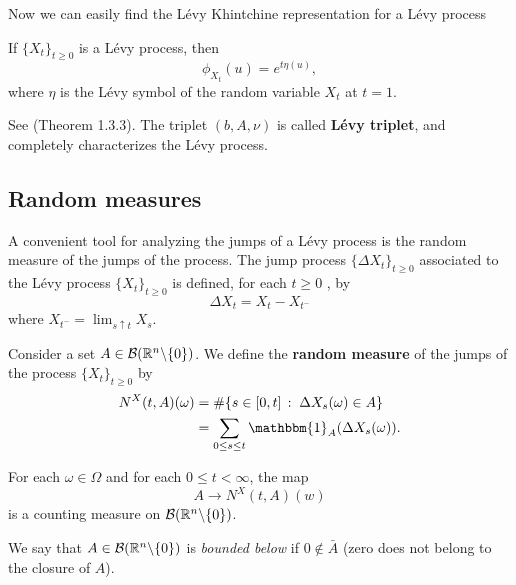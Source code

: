 Now we can easily find the Lévy Khintchine representation for a Lévy process
\begin{Theorem}
 If $\{X_t\}_{t \ge 0}$ is a Lévy process, then
 \begin{equation}\label{Levy_Kint}
  \phi_{X_t}(u) = e^{t \eta(u)},
 \end{equation}
where $\eta$ is the Lévy symbol of the random variable $X_t$ at $t=1$.
\end{Theorem}
See \cite{Applebaum} (Theorem 1.3.3).
The triplet $(b, A, \nu)$ is called \textbf{Lévy triplet}, and completely characterizes the Lévy process.

\subsection{Random measures}\label{random_measures}

A convenient tool for analyzing the jumps of a Lévy process is the random
measure of the jumps of the process.
The jump process $\{\Delta X_t\}_{t \ge 0}$ associated to the Lévy process $\{X_t\}_{t \ge 0}$ is
defined, for each $t \geq 0$ , by
\begin{equation}\label{jump}
 \Delta X_t = X_t - X_{t^-}
\end{equation}
where $X_{t^-} = \lim_{s\uparrow t} X_s $.\\ 
\begin{Definition}
Consider a set $A \in \mathcal{B}(\mathbb{R}^n \backslash \{ 0 \})$.
We define the \textbf{random measure} of the jumps of the process $\{X_t\}_{t \ge 0}$ by
\begin{align}
 N^X(t,A)(\omega) &= \# \{ s \in [0,t] \, : \; \Delta X_s(\omega) \in A  \} \\
		   &= \sum_{0 \leq s \leq t} \mathbbm{1}_A(\Delta X_s(\omega)) . \nonumber
\end{align} 
\end{Definition}
For each $\omega \in \Omega$ and for each $0 \leq t < \infty$, the map 
$$ A \to N^X(t,A)(w) $$ 
is a counting measure on $\mathcal{B}(\mathbb{R}^n \backslash \{ 0 \})$. %

We say that $A\in \mathcal{B}(\mathbb{R}^n \backslash \{ 0 \})$ is \emph{bounded below} if $0 \not \in \bar A$ (zero does not belong to the closure of $A$). 

